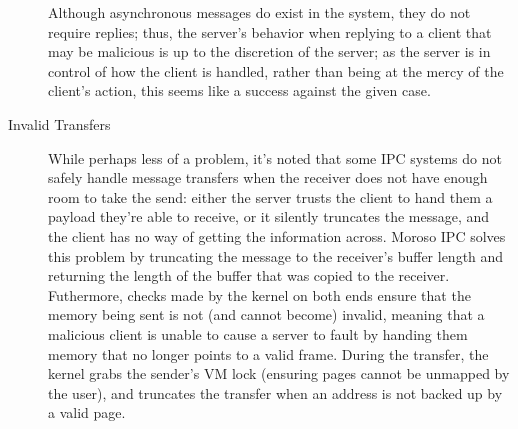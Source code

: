 \documentclass{article}
\begin{document}
\begin{description}
Although asynchronous messages do exist in the system, they do not require replies; thus, the server's behavior when replying to a client that may be malicious is up to the discretion of the server; as the server is in control of how the client is handled, rather than being at the mercy of the client's action, this seems like a success against the given case.

\item[Invalid Transfers] While perhaps less of a problem, it's noted that some IPC systems do not safely handle message transfers when the receiver does not have enough room to take the send: either the server trusts the client to hand them a payload they're able to receive, or it silently truncates the message, and the client has no way of getting the information across.  Moroso IPC solves this problem by truncating the message to the receiver's buffer length and returning the length of the buffer that was copied to the receiver.  Futhermore, checks made by the kernel on both ends ensure that the memory being sent is not (and cannot become) invalid, meaning that a malicious client is unable to cause a server to fault by handing them memory that no longer points to a valid frame.  During the transfer, the kernel grabs the sender's VM lock (ensuring pages cannot be unmapped by the user), and truncates the transfer when an address is not backed up by a valid page.\\

      


\end{description}
\end{document}
